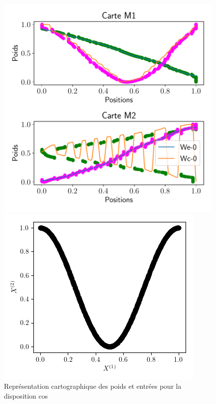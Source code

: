 \documentclass[../main]{subfiles}
\begin{document}
\begin{figure}
	\begin{minipage}{0.66\textwidth}
	\includegraphics[width=\textwidth]{2som_cos_w.pdf}
	\caption{Représentation cartographique des poids et entrées pour la disposition cos}
	\end{minipage}
	\begin{minipage}{0.33\textwidth}
		\includegraphics[width=\textwidth]{2som_cos_in.png}
	\end{minipage}
\end{figure}
\end{document}
